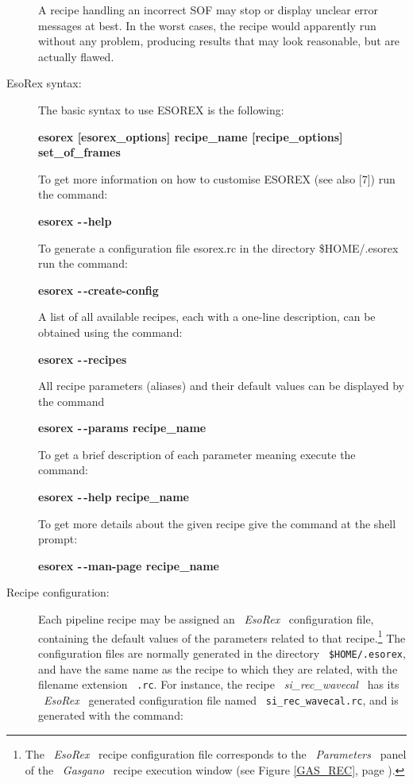 \begin{description}
A recipe handling an incorrect SOF may stop or display unclear 
error messages at best. In the worst cases, the recipe 
would apparently run without any problem, producing results that may 
look reasonable, but are actually flawed.

\item [EsoRex syntax:]

The basic syntax to use ESOREX is the following:

{\bf esorex [esorex\_options] recipe\_name [recipe\_options] set\_of\_frames}

To get more information on how to customise ESOREX (see also [7]) run the command:

{\bf esorex -\,-help}

To generate a configuration file esorex.rc in the directory \${HOME}/.esorex run the command:

{\bf esorex -\,-create-config}

A list of all available recipes, each with a one-line description, can be 
obtained using the command:

{\bf esorex -\,-recipes}

All recipe parameters (aliases) and their default values can be displayed by 
the command

{\bf esorex -\,-params recipe\_name}

To get a brief description of each parameter meaning execute the command:

{\bf esorex -\,-help recipe\_name}

To get more details about the given recipe give the command at the shell 
prompt:

{\bf esorex -\,-man-page recipe\_name}


\item [Recipe configuration:]

Each pipeline recipe may be assigned an \ {\it EsoRex} \ configuration 
file, containing the default values of the parameters related to that 
recipe.\footnote{The \ {\it EsoRex} \ recipe configuration file 
corresponds to the \ {\it Parameters} \ panel of the \ {\it Gasgano} \ 
recipe execution window (see Figure \ref{GAS_REC}, page \pageref{GAS_REC}).}
The configuration files are normally generated in the directory 
\ {\tt \$HOME/.esorex}, 
and have the same name as the recipe to which they are related, 
with the filename extension \ {\tt .rc}. For instance, the recipe 
\ {\it si\_rec\_wavecal} \ has its \ {\it EsoRex} \ generated configuration 
file named \ {\tt si\_rec\_wavecal.rc}, and is generated with the command:


\end{description}
